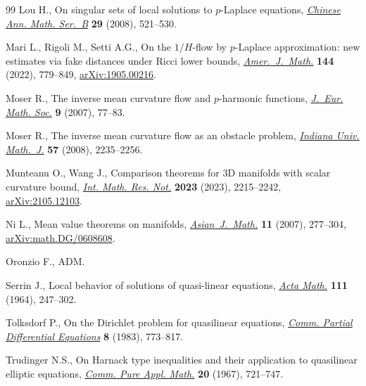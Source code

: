 \begin{thebibliography}{99}
Lou H., On singular sets of local solutions to {$p$}-{L}aplace equations,
 \href{https://doi.org/10.1007/s11401-007-0312-y}{\textit{Chinese Ann. Math. Ser.~B}} \textbf{29} (2008), 521--530.

Mari L., Rigoli M., Setti A.G., On the {$1/H$}-flow by {$p$}-{L}aplace
 approximation: new estimates via fake distances under {R}icci lower bounds,
 \href{https://doi.org/10.1353/ajm.2022.0016}{\textit{Amer.~J.~Math.}} \textbf{144} (2022), 779--849, \href{https://arxiv.org/abs/1905.00216}{arXiv:1905.00216}.

Moser R., The inverse mean curvature flow and {$p$}-harmonic functions,
 \href{https://doi.org/10.4171/JEMS/73}{\textit{J.~Eur. Math. Soc.}} \textbf{9} (2007), 77--83.

Moser R., The inverse mean curvature flow as an obstacle problem,
 \href{https://doi.org/10.1512/iumj.2008.57.3385}{\textit{Indiana Univ. Math.~J.}} \textbf{57} (2008), 2235--2256.

Munteanu O., Wang J., Comparison theorems for 3{D} manifolds with scalar
 curvature bound, \href{https://doi.org/10.1093/imrn/rnab307}{\textit{Int. Math. Res. Not.}} \textbf{2023} (2023),
 2215--2242, \href{https://arxiv.org/abs/2105.12103}{arXiv:2105.12103}.

Ni L., Mean value theorems on manifolds, \href{https://doi.org/10.4310/AJM.2007.v11.n2.a6}{\textit{Asian~J.~Math.}} \textbf{11}
 (2007), 277--304, \href{https://arxiv.org/abs/math.DG/0608608}{arXiv:math.DG/0608608}.

Oronzio F., {ADM}.

Serrin J., Local behavior of solutions of quasi-linear equations, \href{https://doi.org/10.1007/BF02391014}{\textit{Acta
 Math.}} \textbf{111} (1964), 247--302.

Tolksdorf P., On the {D}irichlet problem for quasilinear equations,
 \href{https://doi.org/10.1080/03605308308820285}{\textit{Comm. Partial Differential Equations}} \textbf{8} (1983), 773--817.

Trudinger N.S., On {H}arnack type inequalities and their application to
 quasilinear elliptic equations, \href{https://doi.org/10.1002/cpa.3160200406}{\textit{Comm. Pure Appl. Math.}} \textbf{20}
 (1967), 721--747.


\end{thebibliography}
